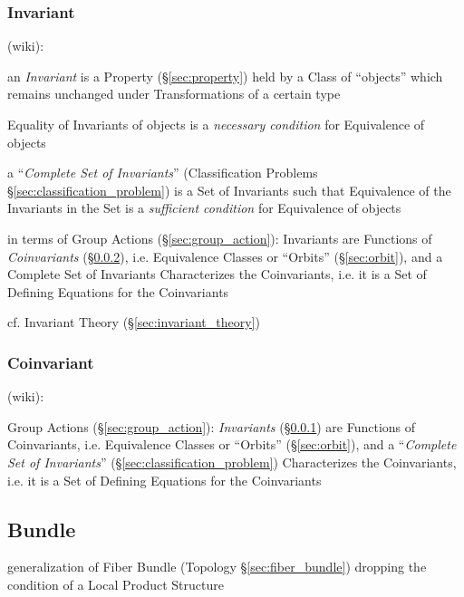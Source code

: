 \subsubsection{Invariant}\label{sec:invariant}

(wiki):

an \emph{Invariant} is a Property (\S\ref{sec:property}) held by a Class
of ``objects'' which remains unchanged under Transformations of a certain type

Equality of Invariants of objects is a \emph{necessary condition} for
Equivalence of objects

a ``\emph{Complete Set of Invariants}'' (Classification Problems
\S\ref{sec:classification_problem}) is a Set of Invariants such that Equivalence
of the Invariants in the Set is a \emph{sufficient condition} for Equivalence of
objects

in terms of Group Actions (\S\ref{sec:group_action}): Invariants are Functions
of \emph{Coinvariants} (\S\ref{sec:coinvariant}), i.e. Equivalence Classes or
``Orbits'' (\S\ref{sec:orbit}), and a Complete Set of Invariants Characterizes
the Coinvariants, i.e. it is a Set of Defining Equations for the Coinvariants

cf. Invariant Theory (\S\ref{sec:invariant_theory})



\subsubsection{Coinvariant}\label{sec:coinvariant}

(wiki):

Group Actions (\S\ref{sec:group_action}): \emph{Invariants}
(\S\ref{sec:invariant}) are Functions of Coinvariants, i.e. Equivalence Classes
or ``Orbits'' (\S\ref{sec:orbit}), and a ``\emph{Complete Set of Invariants}''
(\S\ref{sec:classification_problem}) Characterizes the Coinvariants, i.e. it is
a Set of Defining Equations for the Coinvariants



\subsection{Bundle}\label{sec:bundle}

generalization of Fiber Bundle (Topology \S\ref{sec:fiber_bundle}) dropping the
condition of a Local Product Structure

